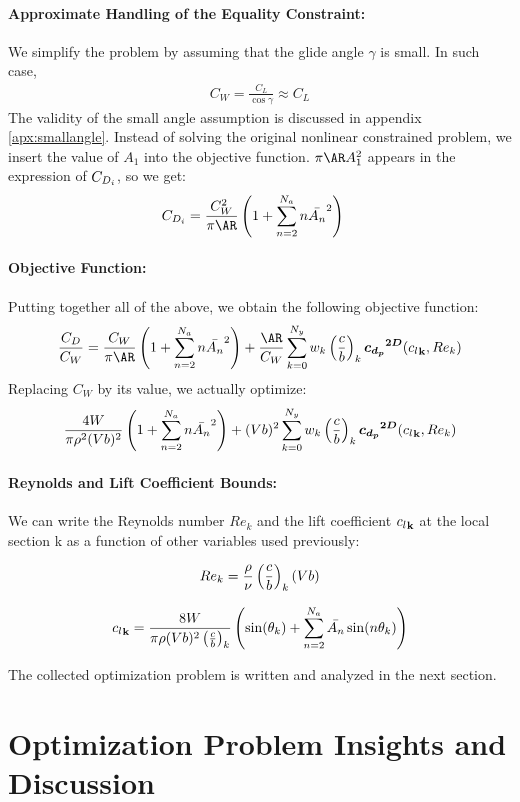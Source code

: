 \documentclass[letterpaper,12pt]{article}
\begin{document}
\paragraph{Approximate Handling of the Equality Constraint:} We simplify the problem by assuming that the glide angle $\gamma$ is small.
In such case,
\begin{align}
	C_W = \frac{C_L}{\cos \gamma} \approx C_L
	\label{eq:A1}
\end{align}
The validity of the small angle assumption is discussed in appendix \ref{apx:smallangle}.
Instead of solving the original nonlinear constrained problem, we insert the value of $A_1$
 into the objective function. $\pi \AR A_1^2$ appears in the expression of $C_{D_i}$, so we get: 
 \begin{align*}
	\CDi &= \frac{C_W^2}{\pi \AR} \left(1+\sum_{n=2}^{N_a} n \An{n}^2\right)
 \end{align*}

 \paragraph{Objective Function:}Putting together all of the above, we obtain the following objective function:
$$\frac{C_D}{C_W} = \frac{C_W}{\pi \AR} \left(1+\sum_{n=2}^{N_a} n \An{n}^2\right) +
\frac {\AR} {C_W} \sum_{k=0}^{N_y} w_k \cb{k} \cddat(\cl{k}, Re_k) $$
Replacing $C_W$ by its value, we actually optimize:
$$\frac{4W}{\pi \rho^2 (Vb)^2} \left(1+\sum_{n=2}^{N_a} n \bar{A_{n}}^2\right) +
(Vb)^2 \sum_{k=0}^{N_y} w_k \left( \frac c b \right)_{k} \boldsymbol{{c_{d_p}}^{2D}}({c_l}_{\bf k}, Re_k) $$


\paragraph{Reynolds and Lift Coefficient Bounds:} We can write the Reynolds number $Re_{k}$ and the lift coefficient ${c_l}_{\bf k}$ at the local section k as a function of other variables used previously:

$$Re_{k} = \frac{\rho}{\nu}\left( \frac c b \right)_{k}(Vb) $$

$$
	{c_l}_{\bf k} = \frac{8W}{\pi \rho (Vb)^2\left( \frac c b \right)_{k}} \left(\sin(\theta_k) + \sum_{n=2}^{N_a} \bar{A_{n}} \sin(n \theta_k)\right)
$$


The collected optimization problem is written and analyzed in the next section.

\section{Optimization Problem Insights and Discussion}
\end{document}
